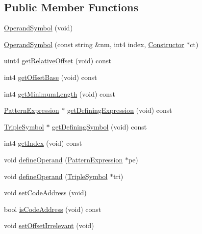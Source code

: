 \subsection*{Public Member Functions}
\begin{DoxyCompactItemize}
\item 
\mbox{\hyperlink{class_operand_symbol_a95692da8b2a608191bb4711d42c9b09f}{Operand\+Symbol}} (void)
\item 
\mbox{\hyperlink{class_operand_symbol_a034b58e5d1eedcfeee9f85ea699ac56a}{Operand\+Symbol}} (const string \&nm, int4 index, \mbox{\hyperlink{class_constructor}{Constructor}} $\ast$ct)
\item 
uint4 \mbox{\hyperlink{class_operand_symbol_a172e311e45795d49ee679fac4a35faad}{get\+Relative\+Offset}} (void) const
\item 
int4 \mbox{\hyperlink{class_operand_symbol_ae4852740136d240df30da3fb8154e1fa}{get\+Offset\+Base}} (void) const
\item 
int4 \mbox{\hyperlink{class_operand_symbol_a449067986ae0236c97cbdec8de4c4723}{get\+Minimum\+Length}} (void) const
\item 
\mbox{\hyperlink{class_pattern_expression}{Pattern\+Expression}} $\ast$ \mbox{\hyperlink{class_operand_symbol_ac93d6e408054938945aa9fc8cd6fcc38}{get\+Defining\+Expression}} (void) const
\item 
\mbox{\hyperlink{class_triple_symbol}{Triple\+Symbol}} $\ast$ \mbox{\hyperlink{class_operand_symbol_ac13b93b87472c1980d6cad5be122997a}{get\+Defining\+Symbol}} (void) const
\item 
int4 \mbox{\hyperlink{class_operand_symbol_ab4bccbaf51039ac104de608792dcc698}{get\+Index}} (void) const
\item 
void \mbox{\hyperlink{class_operand_symbol_a5f2bc99daa08301586d3c8dd00261033}{define\+Operand}} (\mbox{\hyperlink{class_pattern_expression}{Pattern\+Expression}} $\ast$pe)
\item 
void \mbox{\hyperlink{class_operand_symbol_af779510f6032b577ddfe3453fccfea2f}{define\+Operand}} (\mbox{\hyperlink{class_triple_symbol}{Triple\+Symbol}} $\ast$tri)
\item 
void \mbox{\hyperlink{class_operand_symbol_af7a8f9c15ef41de7385def495e073c0b}{set\+Code\+Address}} (void)
\item 
bool \mbox{\hyperlink{class_operand_symbol_afceafc766167e655252176850067b48b}{is\+Code\+Address}} (void) const
\item 
void \mbox{\hyperlink{class_operand_symbol_af922e31dad656d8611d23e1e816b9279}{set\+Offset\+Irrelevant}} (void)

\end{DoxyCompactItemize}
